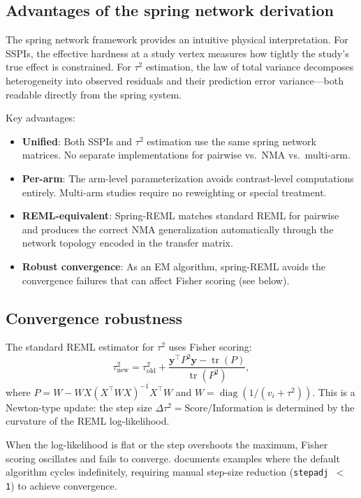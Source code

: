 \documentclass[12pt]{article}
\newcommand{\tr}{\operatorname{tr}}
\newcommand{\diag}{\operatorname{diag}}
\begin{document}
\subsection{Advantages of the spring network derivation}

The spring network framework provides an intuitive physical
interpretation.  For SSPIs, the effective hardness at a study vertex
measures how tightly the study's true effect is constrained.  For
$\tau^2$ estimation, the law of total variance decomposes heterogeneity
into observed residuals and their prediction error variance---both
readable directly from the spring system.

Key advantages:
\begin{itemize}
  \item \textbf{Unified}: Both SSPIs and $\tau^2$ estimation use the
    same spring network matrices.  No separate implementations for
    pairwise vs.\ NMA vs.\ multi-arm.
  \item \textbf{Per-arm}: The arm-level parameterization avoids
    contrast-level computations entirely.  Multi-arm studies require
    no reweighting or special treatment.
  \item \textbf{REML-equivalent}: Spring-REML matches standard REML
    for pairwise and produces the correct NMA generalization
    automatically through the network topology encoded in the transfer
    matrix.
  \item \textbf{Robust convergence}: As an EM algorithm, spring-REML
    avoids the convergence failures that can affect Fisher scoring
    (see below).
\end{itemize}

\subsection{Convergence robustness}

The standard REML estimator for $\tau^2$ uses Fisher scoring:
\begin{equation}
  \tau^2_{\text{new}} = \tau^2_{\text{old}}
    + \frac{\mathbf{y}^\top P^2 \mathbf{y} - \tr(P)}{\tr(P^2)},
\end{equation}
where $P = W - WX(X^\top WX)^{-1}X^\top W$ and $W = \diag(1/(v_i + \tau^2))$.
This is a Newton-type update: the step size $\Delta\tau^2 = \text{Score}/\text{Information}$
is determined by the curvature of the REML log-likelihood.

When the log-likelihood is flat or the step overshoots the maximum,
Fisher scoring oscillates and fails to converge.
\citet{Viechtbauer2005convergence} documents examples where the default
algorithm cycles indefinitely, requiring manual step-size reduction
(\texttt{stepadj\,$<$\,1}) to achieve convergence.
\end{document}
